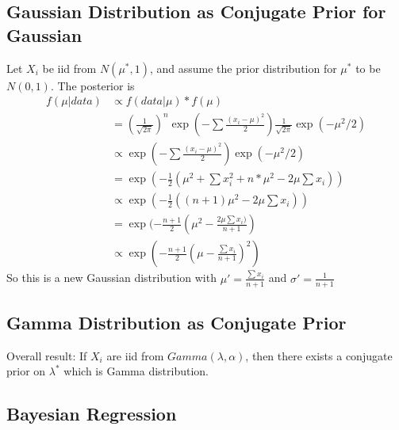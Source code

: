\subsection{Gaussian Distribution as Conjugate Prior for Gaussian} 
Let $X_i$ be iid from $N(\mu^*,1)$, and assume the prior distribution for $\mu^*$ to be $N(0,1)$. The posterior is 
    \begin{align*}
        f(\mu|data) 
        & \propto f(data|\mu) *f(\mu) \\
        & = (\frac{1}{\sqrt{2\pi}})^n\exp(-\sum \frac{(x_i-\mu)^2}{2}) \frac{1}{\sqrt{2\pi}}\exp(-\mu^2/2)\\
        & \propto \exp(-\sum \frac{(x_i-\mu)^2}{2}) \exp(-\mu^2/2) \\
        & =\exp(-\frac{1}{2} (\mu^2 + \sum x_i^2 + n*\mu^2 - 2\mu \sum x_i))\\
        & \propto \exp(-\frac{1}{2} ((n+1)\mu^2 - 2\mu \sum x_i))\\
        & = \exp(-\frac{n+1}{2} (\mu^2 - \frac{2\mu \sum x_i)}{n+1})\\
        & \propto \exp(-\frac{n+1}{2}(\mu-\frac{\sum x_i}{n+1})^2)
    \end{align*}
So this is a new Gaussian distribution with $\mu' = \frac{\sum x_i}{n+1}$ and $\sigma' = \frac{1}{n+1}$

\subsection{Gamma Distribution as Conjugate Prior} 
Overall result: If $X_i$ are iid from $Gamma(\lambda, \alpha)$, then there exists a conjugate prior on $\lambda^*$ which is Gamma distribution.  


\subsection{Bayesian Regression}

